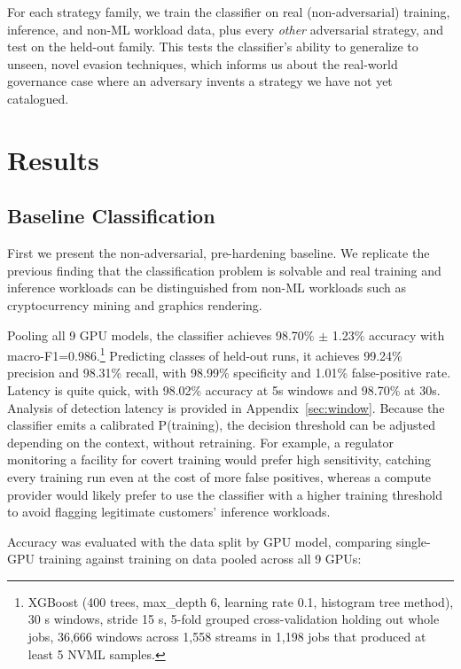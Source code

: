 For each strategy family, we train the classifier on real (non-adversarial) training, inference, and non-ML workload data, plus every \emph{other} adversarial strategy, and test on the held-out family. This tests the classifier's ability to generalize to unseen, novel evasion techniques, which informs us about the real-world governance case where an adversary invents a strategy we have not yet catalogued.

\section{Results}
\label{sec:results}

\subsection{Baseline Classification}
\label{sec:baseline}

First we present the non-adversarial, pre-hardening baseline. We replicate the previous finding that the classification problem is solvable and real training and inference workloads can be distinguished from non-ML workloads \citep{tang2022,xu2026} such as cryptocurrency mining and graphics rendering.

Pooling all 9 GPU models, the classifier achieves 98.70\% $\pm$ 1.23\% accuracy with macro-F1=0.986.\footnote{XGBoost (400 trees, max\_depth 6, learning rate 0.1, histogram tree method), 30 s windows, stride 15 s, 5-fold grouped cross-validation holding out whole jobs, 36,666 windows across 1,558 streams in 1,198 jobs that produced at least 5 NVML samples.} Predicting classes of held-out runs, it achieves 99.24\% precision and 98.31\% recall, with 98.99\% specificity and 1.01\% false-positive rate. Latency is quite quick, with 98.02\% accuracy at 5s windows and 98.70\% at 30s. Analysis of detection latency is provided in Appendix~\ref{sec:window}. Because the classifier emits a calibrated P(training), the decision threshold can be adjusted depending on the context, without retraining. For example, a regulator monitoring a facility for covert training would prefer high sensitivity, catching every training run even at the cost of more false positives, whereas a compute provider would likely prefer to use the classifier with a higher training threshold to avoid flagging legitimate customers' inference workloads.

Accuracy was evaluated with the data split by GPU model, comparing single-GPU training against training on data pooled across all 9 GPUs:

